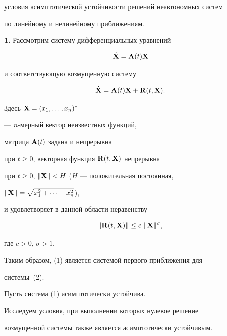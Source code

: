 условия асимптотической устойчивости решений неавтономных систем


по линейному и нелинейному приближениям.


\medskip





{\bf 1.} Рассмотрим систему дифференциальных уравнений


\begin{equation}


\Dot {\bold X}=\bold A(t) \bold X


\end{equation}


и соответствующую возмущенную систему


\begin{equation}


\Dot {\bold X}=\bold A(t)\bold X+\bold R(t,\bold X).


\end{equation}


Здесь $\bold X=(x_1, \dotsc,x_n)^*$


--- $n$-мерный вектор неизвестных функций,


матрица $\bold A(t)$ задана и непрерывна


при $t\geq 0$, векторная функция $\bold R(t,\bold X)$ непрерывна


при $t\geq 0$, $\|\bold X\|< H$ ($H$ --- положительная постоянная,


$\|\bold X\|=\sqrt{x^2_1+ \dotsb +x^2_n}$),


и удовлетворяет в данной области неравенству


\begin{equation}


\|\bold R(t,\bold X)\|\leq c \ \|\bold X\|^\sigma,


\end{equation}


где $c>0$, $\sigma>1$.


Таким образом, (1) является системой первого приближения для


системы~(2).





Пусть система (1) асимптотически устойчива.


Исследуем условия, при выполнении которых нулевое решение


возмущенной системы также является асимптотически устойчивым.





